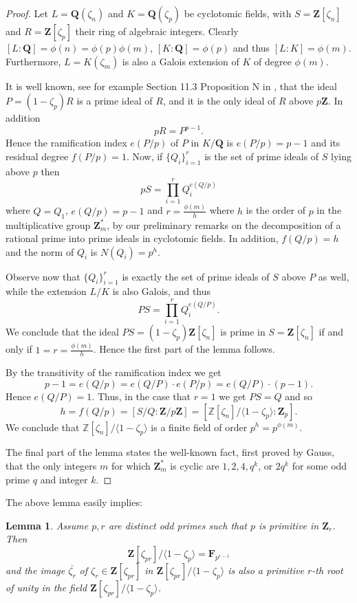 \documentclass[10pt,a4paper]{amsart}
\newtheorem{lemma}[theorem]{Lemma}
\def\Z{\mathbf{Z}}
\def\Q{\mathbf{Q}}
\def\F{\mathbf{F}}
\begin{document}
\begin{proof}
Let $ L = \Q(\zeta_n) $ and $ K = \Q(\zeta_p) $ be cyclotomic fields, with \( S = \Z[\zeta_n] \) and \( R = \Z[\zeta_p] \) their  ring of algebraic integers. Clearly $[L:\Q]= \phi(n) = \phi(p) \phi(m)$,  $[K:\Q]= \phi(p)$ and thus $[L:K]= \phi(m)$. Furthermore, $L= K(\zeta_m)$ is also a Galois extension of $K$ of degree $\phi(m)$.

It is well known, see for example Section 11.3  Proposition N  in \cite{Ribe}, that the  ideal $P = ( 1 - \zeta_p ) R$ is a prime ideal of $R$, and it  is  the only ideal of $R$  above $p\Z$. In addition
\[
pR= P^{p-1}.
\]
Hence the ramification index $e(P/p)$ of $P$ in $K/\Q$ is $e(P/p)=p-1$ and its residual degree $f(P/p)= 1$.
Now, if $\{ Q_i\}_{i=1}^r$ is the set of prime ideals of $S$ lying above $p$ then 
\[
pS= \prod_{i=1}^r Q_i^{e(Q/p)}
\]
where $Q=Q_1$,  $e(Q/p)=p-1$ and $r= \frac{\phi(m)}{h}$ where $h$ is the order of $p$ in the multiplicative group $\Z_m^*$, by 	our preliminary remarks on the decomposition of a rational prime  into prime ideals in cyclotomic fields. In addition, $f(Q/p)=h$ and the norm of $Q_i$ is $N(Q_i)= p^h$. 

Observe now that   $\{Q_i\}_{i=1}^r$ is exactly  the set of prime ideals of $S$ above $P$ as well,  while  the extension $L/K$ is also Galois,  and thus 
\[
PS = \prod_{i=1}^r Q_i^{e(Q/P)}.
\]
We conclude that the ideal $PS= (1-\zeta_p)\Z[\zeta_n]$  is prime in $S= \Z[\zeta_n]$ if and only if $1=r =\frac{\phi(m)}{h}$. Hence the first part of the lemma follows. 

By the transitivity of the ramification index  we get  
\[
  p-1 = e(Q/p) = e(Q/P)\cdot e(P/p)= e(Q/P) \cdot (p-1).
\]
Hence $e(Q/P)=1$. 
Thus, in the case that  $r=1$ we get  $PS=Q$ and so 
\[
h=f(Q/p) = [S/Q:\Z/p\Z]= [
\mathbb{Z}[\zeta_{n}]/\langle 1 - \zeta_p \rangle :\Z_p].
\]
We conclude that $\mathbb{Z}[\zeta_{n}]/\langle 1 - \zeta_p \rangle $ is a finite field of order $p^h= p^{\phi(m)}$. 

The final part of the lemma states the well-known fact, first proved by Gauss, that the only integers 
$m$ for which $ \Z_m^* $ is cyclic are $1,2, 4, q^k $, or $ 2q^k $ for some odd prime $ q $ and integer $ k$. 
\end{proof}

The above lemma easily implies:

\begin{lemma} \label{Lem:z_p-primitive}
    Assume $p, r$ are distinct odd primes such that $p$ is primitive in  $\Z_r$. 
    Then \[
    \Z[\zeta_{pr}]/\langle 1- \zeta_p \rangle = \F_{p^{r-1}}
    \]
    and the image $\bar{\zeta_r}$  of $\zeta_r \in \Z[\zeta_{pr}]$ in  $\Z[\zeta_{pr}]/\langle 1- \zeta_p \rangle$  is also a primitive $r$-th root of unity in the field $\Z[\zeta_{pr}]/\langle 1- \zeta_p \rangle$.
\end{lemma}
\end{document}
